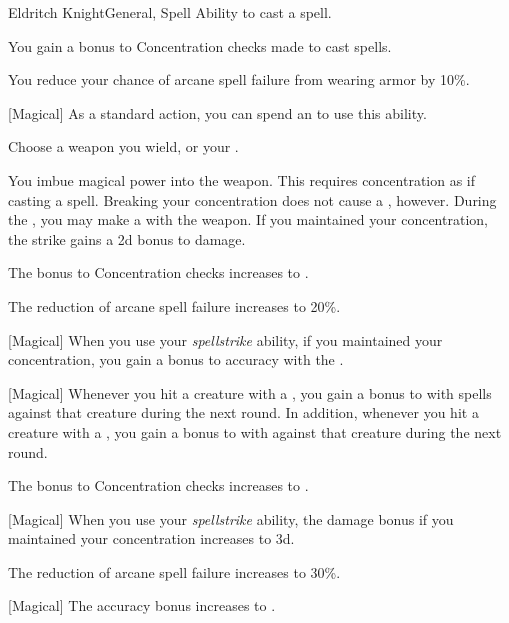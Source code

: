     \begin{feat}{Eldritch Knight}{General, Spell}
        \featpre Ability to cast a spell.
        \featben

         You gain a  bonus to Concentration checks made to cast spells.

         You reduce your chance of arcane spell failure from wearing armor by 10\%.

        [Magical] As a standard action, you can spend an  to use this ability.
        \begin{ability}
            \begin{spelltargetinginfo}
                \spellspecial Choose a weapon you wield, or your .
            \end{spelltargetinginfo}
            \begin{spelleffects}
                \spelleffect You imbue magical power into the weapon.
                This requires concentration as if casting a spell.
                Breaking your concentration does not cause a , however.
                During the , you may make a  with the weapon.
                If you maintained your concentration, the strike gains a \plus2d bonus to damage.
            \end{spelleffects}
        \end{ability}

         The bonus to Concentration checks increases to .

         The reduction of arcane spell failure increases to 20\%.

        [Magical] When you use your \textit{spellstrike} ability, if you maintained your concentration, you gain a  bonus to accuracy with the .

        [Magical] Whenever you hit a creature with a , you gain a  bonus to  with spells against that creature during the next round.
        In addition, whenever you hit a creature with a , you gain a  bonus to  with  against that creature during the next round.

         The bonus to Concentration checks increases to .

        [Magical] When you use your \textit{spellstrike} ability, the damage bonus if you maintained your concentration increases to \plus3d.

         The reduction of arcane spell failure increases to 30\%. 

        [Magical] The accuracy bonus increases to .
    \end{feat}

